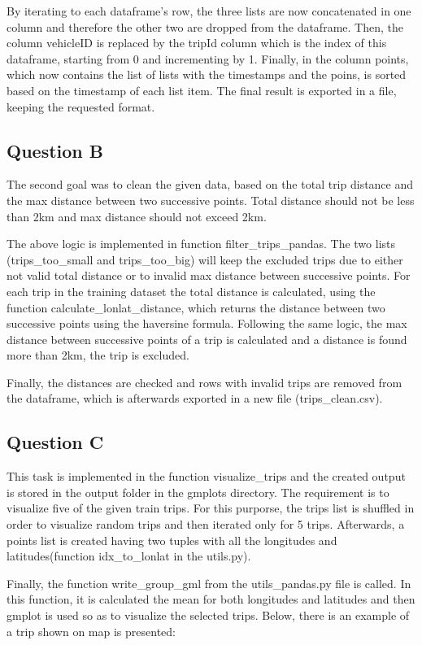 \documentclass[12pt]{article}
\begin{document}
	By iterating to each dataframe's row, the three lists are now concatenated in one column and therefore the other two are dropped from the dataframe. Then, the column vehicleID is replaced by the tripId column which is the index of this dataframe, starting from 0 and incrementing by 1. Finally, in the column points, which now contains the list of lists with the timestamps and the poins, is sorted based on the timestamp of each list item. The final result is exported in a file, keeping the requested format.
	
	\subsection{Question B}
	The second goal was to clean the given data, based on the total trip distance and the max distance between two successive points. Total distance should not be less than 2km and max distance should not exceed 2km.
	
	The above logic is implemented in function filter\_trips\_pandas. The two lists (trips\_too\_small and trips\_too\_big) will keep the excluded trips due to either not valid total distance or to invalid max distance between successive points. For each trip in the training dataset the total distance is calculated, using the function calculate\_lonlat\_distance, which returns the distance between two successive points using the haversine formula. Following the same logic, the max distance between successive points of a trip is calculated and a distance is found more than 2km, the trip is excluded.
	
	Finally, the distances are checked and rows with invalid trips are removed from the dataframe, which is afterwards exported in a new file (trips\_clean.csv).
	
	\subsection{Question C}
	This task is implemented in the function visualize\_trips and the created output is stored in the output folder in the gmplots directory. The requirement is to visualize five of the given train trips. For this purporse, the trips list is shuffled in order to visualize random trips and then iterated only for 5 trips. Afterwards, a points list is created having two tuples with all the longitudes and latitudes(function idx\_to\_lonlat in the utils.py). 
	
	Finally, the function write\_group\_gml from the utils\_pandas.py file is called. In this function, it is calculated the mean for both longitudes and latitudes and then gmplot is used so as to visualize the selected trips. Below, there is an example of a trip shown on map is presented:
	
\end{document}

